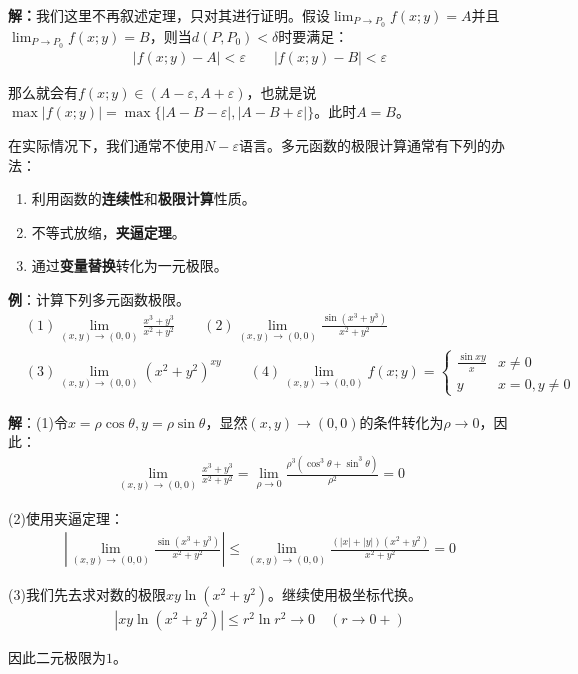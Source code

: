 \documentclass{ctexart}
\let\oldtextbf\textbf %
\renewcommand{\textbf}[1]{\textcolor{btex}{\oldtextbf{#1}}} %
\begin{document}
\textbf{解：}我们这里不再叙述定理，只对其进行证明。假设$\lim_{P\to P_0}f(x;y)=A$并且$\lim_{P\to P_0}f(x;y)=B$，则当$d(P,P_0)<\delta$时要满足：
\begin{align*}
    |f(x;y)-A|<\varepsilon\qquad |f(x;y)-B|<\varepsilon
\end{align*}

那么就会有$f(x;y)\in (A-\varepsilon,A+\varepsilon)$，也就是说$\max|f(x;y)|=\max\{|A-B-\varepsilon|,|A-B+\varepsilon|\}$。此时$A=B$。

在实际情况下，我们通常不使用$N-\varepsilon$语言。多元函数的极限计算通常有下列的办法：
\begin{enumerate}
    \item 利用函数的\textbf{连续性}和\textbf{极限计算}性质。
    \item 不等式放缩，\textbf{夹逼定理}。
    \item 通过\textbf{变量替换}转化为一元极限。
\end{enumerate}

\textbf{例}：计算下列多元函数极限。
\begin{align*}
   & (1)\lim_{(x,y)\to(0,0)}\frac{x^3+y^3}{x^2+y^2}\qquad (2)\lim_{(x,y)\to(0,0)}\frac{\sin(x^3+y^3)}{x^2+y^2}\\
    &(3)\lim_{(x,y)\to(0,0)}(x^2+y^2)^{xy}\qquad (4)\lim_{(x,y)\to (0,0)}f(x;y)=\begin{cases}
        \frac{\sin xy}{x}&x\neq 0\\
        y &x=0,y\neq 0
    \end{cases}
\end{align*}

\textbf{解}：(1)令$x=\rho\cos\theta,y=\rho\sin\theta$，显然$(x,y)\to(0,0)$的条件转化为$\rho\to 0$，因此：
\begin{align*}
    \lim_{(x,y)\to(0,0)}\frac{x^3+y^3}{x^2+y^2}=\lim_{\rho\to 0}\frac{\rho^3(\cos^3\theta+\sin^3\theta)}{\rho^2}=0
\end{align*}

(2)使用夹逼定理：
\begin{align*}
   \left| \lim_{(x,y)\to(0,0)}\frac{\sin(x^3+y^3)}{x^2+y^2}\right|\leq\lim_{(x,y)\to(0,0)}\frac{(|x|+|y|)(x^2+y^2)}{x^2+y^2}=0
\end{align*}

(3)我们先去求对数的极限$xy\ln(x^2+y^2)$。继续使用极坐标代换。
\begin{align*}
    |xy\ln(x^2+y^2)|\leq r^2\ln r^2\to 0 \quad(r\to 0+)
\end{align*}

因此二元极限为$1$。
\end{document}
